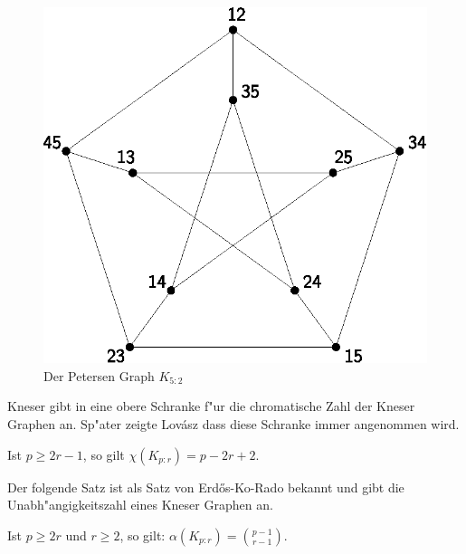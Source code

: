 \begin{figure}[h]
  \centering
  \includegraphics{images/petersen}
  \caption{Der Petersen Graph $K_{5:2}$}
  \label{fig:petersen}
\end{figure}
Kneser gibt in \cite{Kneser55} eine obere Schranke f"ur die chromatische Zahl der Kneser Graphen an. Sp"ater zeigte Lov\'asz \cite{Lovasz78} dass diese Schranke immer angenommen wird.
\begin{theorem}
  Ist $p\geq 2r-1$, so gilt
  $\chi(K_{p:r}) = p-2r+2$. \label{thm:kneserfarbung}
\end{theorem}

Der folgende Satz ist als Satz von Erd\H{o}s-Ko-Rado \cite{ErdosKoRado61} bekannt und gibt die Unabh"angigkeitszahl eines Kneser Graphen an.
\begin{theorem}
  Ist $p\geq 2r$ und $r \geq 2$, so gilt: 
  $\alpha(K_{p:r})= \binom{p-1}{r-1}$.
  \label{thm:ErdosKoRado}
\end{theorem}

